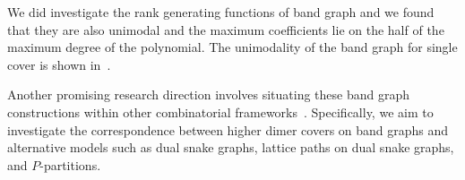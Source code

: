 \documentclass[11pt]{amsart}
\theoremstyle{definition}
\theoremstyle{remark}
\numberwithin{equation}{section}
\begin{document}
We did investigate the rank generating functions of band graph and we found that they are also unimodal and the maximum coefficients lie on the half of the maximum degree of the polynomial. The unimodality of the band graph for single cover is shown in~\cite{OR23,OOR24}.

Another promising research direction involves situating these band graph constructions within other combinatorial frameworks~\cite{BOSZ26}. Specifically, we aim to investigate the correspondence between higher dimer covers on band graphs and alternative models such as dual snake graphs, lattice paths on dual snake graphs, and $P$-partitions.

\printbibliography
\end{document}
